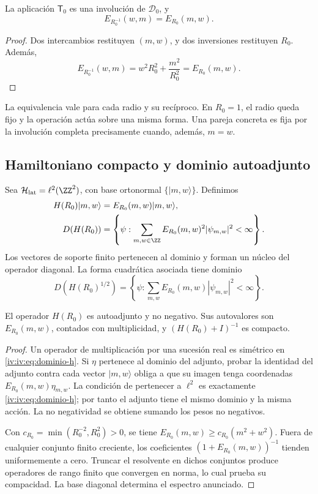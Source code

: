 \begin{theorem}
\label{iv:iv:thm:dualidad-escalar}
La aplicación \(\mathsf T_0\) es una involución de
\(\mathscr D_0\), y
\[
 E_{R_0^{-1}}(w,m)=E_{R_0}(m,w).
\]
\end{theorem}
\begin{proof}
Dos intercambios restituyen \((m,w)\), y dos inversiones restituyen
\(R_0\). Además,
\[
 E_{R_0^{-1}}(w,m)=w^2R_0^2+\frac{m^2}{R_0^2}
 =E_{R_0}(m,w).
\]
\end{proof}

La equivalencia vale para cada radio y su recíproco. En \(R_0=1\),
el radio queda fijo y la operación actúa sobre una misma forma.
Una pareja concreta es fija por la involución completa precisamente
cuando, además, \(m=w\).

\subsection{Hamiltoniano compacto y dominio autoadjunto}

Sea \(\mathcal H_{\mathrm{lat}}=\ell^2(\ZZ^2)\), con base
ortonormal \(\{|m,w\rangle\}\). Definimos
\begin{align}
 H(R_0)|m,w\rangle&=E_{R_0}(m,w)|m,w\rangle,\label{iv:iv:eq:hamiltoniano}\\
 D(H(R_0))&=\left\{\psi:\sum_{m,w\in\ZZ}
 E_{R_0}(m,w)^2|\psi_{m,w}|^2<\infty\right\}.\label{iv:iv:eq:dominio-h}
\end{align}
Los vectores de soporte finito pertenecen al dominio y forman un
núcleo del operador diagonal. La forma cuadrática asociada tiene
dominio
\[
 D(H(R_0)^{1/2})=\left\{\psi:\sum_{m,w}
 E_{R_0}(m,w)|\psi_{m,w}|^2<\infty\right\}.
\]

\begin{proposition}
\label{iv:iv:prop:h-autoadjunto}
El operador \(H(R_0)\) es autoadjunto y no negativo. Sus
autovalores son \(E_{R_0}(m,w)\), contados con multiplicidad,
y \((H(R_0)+I)^{-1}\) es compacto.
\end{proposition}
\begin{proof}
Un operador de multiplicación por una sucesión real es simétrico
en \eqref{iv:iv:eq:dominio-h}. Si \(\eta\) pertenece al dominio
del adjunto, probar la identidad del adjunto contra cada vector
\(|m,w\rangle\) obliga a que su imagen tenga coordenadas
\(E_{R_0}(m,w)\eta_{m,w}\). La condición de pertenecer a
\(\ell^2\) es exactamente \eqref{iv:iv:eq:dominio-h}; por tanto
el adjunto tiene el mismo dominio y la misma acción. La no
negatividad se obtiene sumando los pesos no negativos.

Con \(c_{R_0}=\min(R_0^{-2},R_0^2)>0\), se tiene
\(E_{R_0}(m,w)\geq c_{R_0}(m^2+w^2)\). Fuera de cualquier
conjunto finito creciente, los coeficientes
\((1+E_{R_0}(m,w))^{-1}\) tienden uniformemente a cero.
Truncar el resolvente en dichos conjuntos produce operadores
de rango finito que convergen en norma, lo cual prueba su
compacidad. La base diagonal determina el espectro anunciado.
\end{proof}

